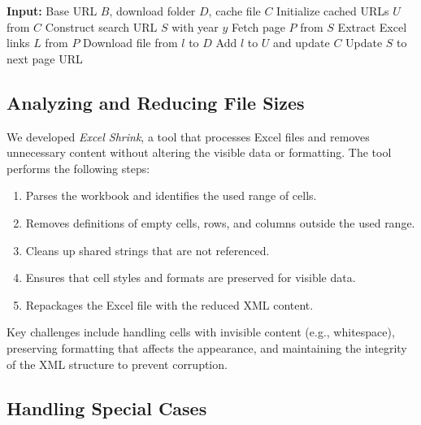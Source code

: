 \documentclass[sigconf]{acmart}
\begin{document}
\begin{algorithm}
  \caption{Web Scraping and Downloading Excel Files with Caching}
  \label{alg:scraper}
  \begin{algorithmic}
      \STATE \textbf{Input:} Base URL $B$, download folder $D$, cache file $C$
      \STATE Initialize cached URLs $U$ from $C$
          \STATE Construct search URL $S$ with year $y$
              \STATE Fetch page $P$ from $S$
              \STATE Extract Excel links $L$ from $P$
                      \STATE Download file from $l$ to $D$
                      \STATE Add $l$ to $U$ and update $C$
                  \ENDIF
              \ENDFOR
              \STATE Update $S$ to next page URL
          \ENDWHILE
      \ENDFOR
  \end{algorithmic}
\end{algorithm}

\subsection{Analyzing and Reducing File Sizes}

We developed \textit{Excel Shrink}, a tool that processes Excel files and removes unnecessary content without altering the visible data or formatting. The tool performs the following steps:

\begin{enumerate}
    \item Parses the workbook and identifies the used range of cells.
    \item Removes definitions of empty cells, rows, and columns outside the used range.
    \item Cleans up shared strings that are not referenced.
    \item Ensures that cell styles and formats are preserved for visible data.
    \item Repackages the Excel file with the reduced XML content.
\end{enumerate}

Key challenges include handling cells with invisible content (e.g., whitespace), preserving formatting that affects the appearance, and maintaining the integrity of the XML structure to prevent corruption.

\subsection{Handling Special Cases}
\end{document}
